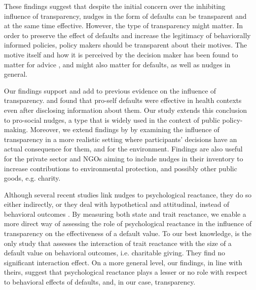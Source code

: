 \documentclass[review, authoryear,12pt]{elsarticle}
\begin{document}
These findings suggest that despite the initial concern over the inhibiting influence of transparency, nudges in the form of defaults can be transparent and at the same time effective. However, the type of transparency might matter. In order to preserve the effect of defaults and increase the legitimacy of behaviorally informed policies, policy makers should be transparent about their motives. The motive itself and how it is perceived by the decision maker has been found to matter for advice \citep{Kuang.2007}, and might also matter for defaults, as well as nudges in general.

Our findings support and add to previous evidence on the influence of transparency. \cite{Loewenstein.2015} and \cite{Kroese.2016} found that pro-self defaults were effective in health contexts even after disclosing information about them. Our study extends this conclusion to pro-social nudges, a type that is widely used in the context of public policy-making. Moreover, we extend findings by \cite{Steffel.2016} by examining the influence of transparency in a more realistic setting where participants' decisions have an actual consequence for them, and for the environment. Findings are also useful for the private sector and NGOs aiming to include nudges in their inventory to increase contributions to environmental protection, and possibly other public goods, e.g. charity.

Although several recent studies link nudges to psychological reactance, they do so either indirectly, or they deal with hypothetical and attitudinal, instead of behavioral outcomes \citep{Haggag.2014, Arad.2015, Loewenstein.2015, Hedlin.2016}. By measuring both state and trait reactance, we enable a more direct way of assessing the role of psychological reactance in the influence of transparency on the effectiveness of a default value. To our best knowledge, \cite{Goswami.2016} is the only study that assesses the interaction of trait reactance with the size of a default value on behavioral outcomes, i.e. charitable giving. They find no significant interaction effect. On a more general level, our findings, in line with theirs, suggest that psychological reactance plays a lesser or no role with respect to behavioral effects of defaults, and, in our case, transparency.
\end{document}
